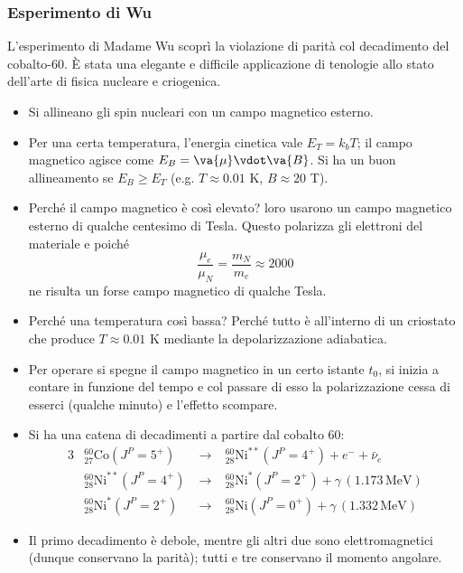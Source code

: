 \subsubsection{Esperimento di Wu}
L'esperimento di Madame Wu scoprì la violazione di parità col decadimento del cobalto-60. È stata una elegante e difficile applicazione di tenologie allo stato dell'arte di fisica nucleare e criogenica.
\begin{itemize}
    \item Si allineano gli spin nucleari con un campo magnetico esterno. 
    \item Per una certa temperatura, l'energia cinetica vale $E_T=k_bT$; il campo magnetico agisce come $E_B=\va{\mu}\vdot\va{B}$. Si ha un buon allineamento se $E_B\geq E_T$ (e.g. $T\approx0.01$ K, $B\approx20$ T).
    \item Perché il campo magnetico è così elevato? loro usarono un campo magnetico esterno di qualche centesimo di Tesla. Questo polarizza gli elettroni del materiale e poiché
    \begin{equation*}
        \frac{\mu_e}{\mu_N}=\frac{m_N}{m_e}\approx2000
    \end{equation*}
    ne risulta un forse campo magnetico di qualche Tesla.
    \item Perché una temperatura così bassa? Perché tutto è all'interno di un criostato che produce $T\approx0.01$ K mediante la depolarizzazione adiabatica.
    \item Per operare si spegne il campo magnetico in un certo istante $t_0$, si inizia a contare in funzione del tempo e col passare di esso la polarizzazione cessa di esserci (qualche minuto) e l'effetto scompare.
    \item Si ha una catena di decadimenti a partire dal cobalto 60:
    \begin{alignat*}{3}
    &^{60}_{27}\mathrm{Co}(J^P=5^+)   &\;\to\;&   ^{60}_{28}\mathrm{Ni}^{**}(J^P=4^+)+e^-+\bar{\nu}_e \\
    &^{60}_{28}\mathrm{Ni}^{**}(J^P=4^+)   &\;\to\;&   ^{60}_{28}\mathrm{Ni}^{*}(J^P=2^+)+\gamma\,(1.173\,\mathrm{MeV}) \\
    &^{60}_{28}\mathrm{Ni}^{*}(J^P=2^+)    &\;\to\;&   ^{60}_{28}\mathrm{Ni}(J^P=0^+)+\gamma\,(1.332\,\mathrm{MeV})
    \end{alignat*}
    \item Il primo decadimento è debole, mentre gli altri due sono elettromagnetici (dunque conservano la parità); tutti e tre conservano il momento angolare. 
    \begin{figure}[H]

\end{figure}
\end{itemize}
